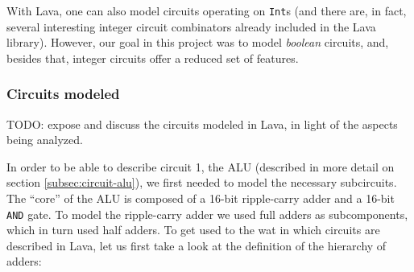 \documentclass[a4paper]{article}
\begin{document}
            With Lava, one can also model circuits operating on \texttt{Int}s (and there are, in
            fact, several interesting integer circuit combinators already included in the Lava
            library). However, our goal in this project was to model \emph{boolean} circuits, and,
            besides that, integer circuits offer a reduced set of features.


            \subsubsection{Circuits modeled}
            \label{subsubsec:lava-circuits}
                TODO: expose and discuss the circuits modeled in Lava, in light of the aspects being
                analyzed.

                In order to be able to describe circuit 1, the ALU (described in more detail on
                section \ref{subsec:circuit-alu}), we first needed to model the necessary
                subcircuits. The ``core'' of the ALU is composed of a 16-bit ripple-carry adder and
                a 16-bit \texttt{AND} gate. To model the ripple-carry adder we used full adders as
                subcomponents, which in turn used half adders. To get used to the wat in which
                circuits are described in Lava, let us first take a look at the definition of the
                hierarchy of adders:
                
\end{document}
